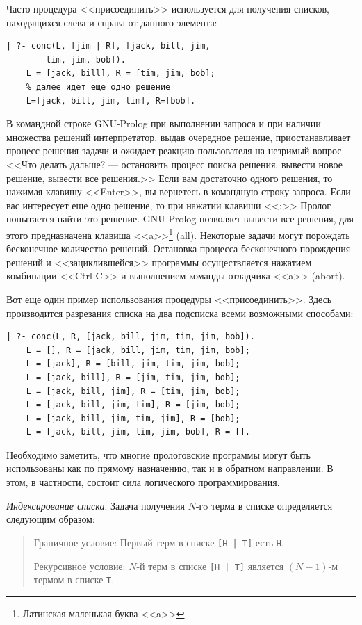 \documentclass[12pt, openany, twoside]{book} %
\begin{document}
Часто процедура <<присоединить>> используется для получения списков, находящихся слева и справа от данного элемента:
{\tt\begin{verbatim}
| ?- conc(L, [jim | R], [jack, bill, jim,
        tim, jim, bob]).
    L = [jack, bill], R = [tim, jim, bob];
    % далее идет еще одно решение
    L=[jack, bill, jim, tim], R=[bob].
\end{verbatim}}
В командной строке GNU-Prolog при выполнении запроса и при наличии множества решений интерпретатор, выдав очередное решение, приостанавливает процесс решения задачи и ожидает реакцию пользователя на незримый вопрос <<Что делать дальше? --- остановить процесс поиска решения, вывести новое решение, вывести все решения.>> Если вам достаточно одного решения, то нажимая клавишу <<Enter>>, вы вернетесь в командную строку запроса. Если вас интересует еще одно решение, то при нажатии клавиши <<;>> Пролог попытается найти это решение. GNU-Prolog позволяет вывести все решения, для этого предназначена клавиша <<a>>\footnote{Латинская маленькая буква <<a>>} (all). Некоторые задачи могут порождать бесконечное количество решений. Остановка процесса бесконечного порождения решений и <<зациклившейся>> программы осуществляется нажатием комбинации <<Ctrl-C>> и выполнением команды отладчика <<a>> (abort).

Вот еще один пример использования процедуры <<присоединить>>. Здесь производится разрезания списка на два подсписка всеми возможными способами:
{\tt\begin{verbatim}
| ?- conc(L, R, [jack, bill, jim, tim, jim, bob]).
    L = [], R = [jack, bill, jim, tim, jim, bob];
    L = [jack], R = [bill, jim, tim, jim, bob];
    L = [jack, bill], R = [jim, tim, jim, bob];
    L = [jack, bill, jim], R = [tim, jim, bob];
    L = [jack, bill, jim, tim], R = [jim, bob];
    L = [jack, bill, jim, tim, jim], R = [bob];
    L = [jack, bill, jim, tim, jim, bob], R = [].
\end{verbatim}}
Необходимо заметить, что многие прологовские программы могут быть использованы как по прямому назначению, так и в обратном направлении. В этом, в частности, состоит сила логического программирования.

\emph{Индексирование списка}. Задача получения $N$-гo терма в списке определяется следующим образом:

\begin{quote}
\noindent Граничное условие: Первый терм в списке {\tt [Н | Т]} есть {\tt Н}.

\noindent Рекурсивное условие: $N$-й терм в списке {\tt [Н | Т]} является $(N-1)$-м термом в списке {\tt Т}.
\end{quote}
\end{document}
